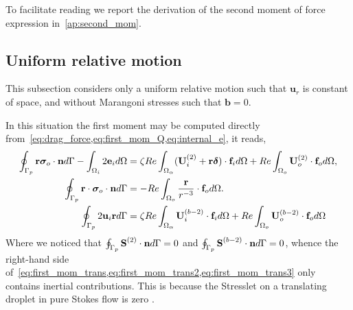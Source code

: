 To facilitate reading we report the derivation of the second moment of force expression in~\ref{ap:second_mom}. 


\subsection{Uniform relative motion}

This subsection considers only a uniform relative motion such that $\textbf{u}_r$ is constant of space, and without Marangoni stresses such that $\textbf{b}=0$.


In this situation the first moment may be computed directly from~\ref{eq:drag_force,eq:first_mom_Q,eq:internal_e}, it reads, 
\begin{align}
    \label{eq:first_mom_trans}
    \intS[p]{\textbf{r}\bm\sigma_{o}\cdot \textbf{n}}
    - \intO[i]{2\textbf{e}_i}
    &=
    \zeta Re \intO{(\textbf{U}_{i}^{(2)} + \textbf{r}\bm\delta)\cdot \textbf{f}_{i}} 
    + Re\intO[o]{\textbf{U}_{o}^{(2)}\cdot \textbf{f}_{o}},\\
    \label{eq:first_mom_trans2}
    \intS[p]{\textbf{r} \cdot  \bm\sigma_{o}\cdot \textbf{n}}
    &=
    - Re\intO[o]{\frac{\textbf{r}}{r^{-3}}\cdot \textbf{f}_{o}}. \\
    \label{eq:first_mom_trans3}
    \intS[p]{2\textbf{u}_{i} \textbf{r}}
    &=
    \zeta Re \intO{\textbf{U}_{i}^{(b-2)}\cdot \textbf{f}_{i}} 
    + Re\intO[o]{\textbf{U}_{o}^{(b-2)}\cdot \textbf{f}_{o}}
\end{align}
Where we noticed that $\intS[p]{\textbf{S}^{(2)}\cdot \textbf{n}} = 0$ and $\intS[p]{\textbf{S}^{(b-2)}\cdot \textbf{n}} = 0$, whence the right-hand side of~\ref{eq:first_mom_trans,eq:first_mom_trans2,eq:first_mom_trans3} only contains inertial contributions. 
This is because the Stresslet on a translating droplet in pure Stokes flow is zero \citep{kim2013microhydrodynamics}. 


